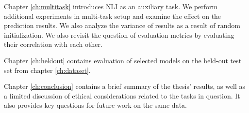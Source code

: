 Chapter \ref{ch:multitask} introduces \ac{NLI} as an auxiliary task. We
perform additional experiments in multi-task setup and examine the effect on
the prediction results. We also analyze the variance of results as a result
of random initialization. We also revisit the question of evaluation metrics
by evaluating their correlation with each other.

Chapter \ref{ch:heldout} contains evaluation of selected models on the
held-out test set from chapter \ref{ch:dataset}.

Chapter \ref{ch:conclusion} contains a brief summary of the thesis' results,
as well as a limited discussion of ethical considerations related to the
tasks in question. It also provides key questions for future work on the same
data.

\acresetall
